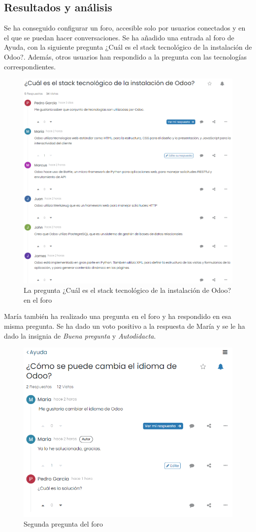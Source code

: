 \subsection{Resultados y análisis}
Se ha conseguido configurar un foro, accesible solo por usuarios conectados y en el que se puedan hacer conversaciones.
Se ha añadido una entrada al foro de Ayuda, con la siguiente pregunta ¿Cuál es el stack tecnológico de la instalación de Odoo?. Además, otros usuarios han respondido a la pregunta con las tecnologías correspondientes. 
\newpage
\begin{figure}[h]
    \centering
    \includegraphics[width=1\linewidth]{fotosGestCon/pregunta1.png}
    \caption{La pregunta ¿Cuál es el stack tecnológico de la instalación de Odoo? en el foro}
    \label{fig:enter-label}
\end{figure}
María también ha realizado una pregunta en el foro y ha respondido en esa misma pregunta. Se ha dado un voto positivo a la respuesta de María y se le ha dado la insignia de \textit{Buena pregunta} y \textit{Autodidacta}. 
\newpage
\begin{figure}[h]
    \centering
    \includegraphics[width=0.75\linewidth]{fotosGestCon/pregunta2.png}
    \caption{Segunda pregunta del foro}
    \label{fig:enter-label}
\end{figure}
